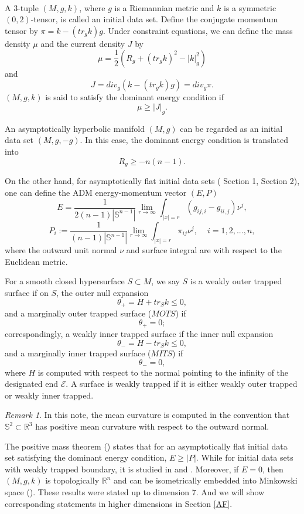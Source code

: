 \documentclass[11pt]{amsart}
\theoremstyle{remark}
\newtheorem{rem}{Remark}[section]
\numberwithin{equation}{section}
\def\R{\mathbb{R}}
\begin{document}
{{\

A 3-tuple $(M,g,k)$, where $g$ is a Riemannian metric and $k$ is a symmetric $(0,2)$-tensor, is called an initial data set. Define the conjugate momentum tensor by $\pi=k-(tr_g k)g$. Under constraint equations, we can define the mass density $\mu$ and the current density $J$ by
$$\mu=\frac{1}{2}(R_g+(tr_g k)^2-|k|_g^2)$$
and $$J=div_g(k-(tr_gk)g)=div_g\pi.$$
$(M,g,k)$ is said to satisfy the dominant energy condition if 
$$\mu\geq|J|_g.$$ 

An asymptotically hyperbolic manifold $(M,g)$ can be regarded as an initial data set $(M,g,-g)$. In this case, the dominant energy condition is translated into $$R_g\geq -n(n-1).$$ 

On the other hand, for asymptotically flat initial data sets (\cite{EHLS} Section 1, \cite{LLU21} Section 2), one can define the ADM energy-momentum vector $(E,P)$  
$$
E = \frac{1}{2(n-1)|\mathbb{S}^{n-1}|} \lim_{r \to \infty} \int_{|x| = r}  ( g_{ij,i} - g _{ii, j} ) \nu^j,
$$ 
$$P_i:=\frac{1}{(n-1)|\mathbb{S}^{n-1}|} \lim_{r \to \infty} \int_{|x| = r}  \pi_{ij} \nu^j, \,\ \,\ \,\ i=1,2,...,n,$$
where the outward unit normal $\nu$ and surface integral are with respect to the Euclidean metric. 

For a smooth closed hypersurface $S\subset M$, we say $S$ is a weakly outer trapped surface if on $S$, the outer null expansion 
$$\theta_+=H+tr_S k \leq 0,$$
and a marginally outer trapped surface ($MOTS$) if 
$$\theta_+=0;$$
correspondingly, 
a weakly inner trapped surface if the inner null expansion 
$$\theta_-=H-tr_S k \leq 0,$$
and a marginally inner trapped surface ($MITS$) if 
$$\theta_-=0,$$ 
where $H$ is computed with respect to the normal pointing to the infinity of the designated end $\mathcal{E}$. A surface is weakly trapped if it is either weakly outer trapped or weakly inner trapped.  

\begin{rem} In this note, the mean curvature is computed in the convention that $\mathbb{S}^2\subset \R^3$ has positive mean curvature with respect to the outward normal.  
\end{rem}

The positive mass theorem (\cite{EHLS}) states that for an asymptotically flat initial data set satisfying the dominant energy condition, $E\geq |P|$. While for initial data sets with weakly trapped boundary, it is studied in \cite{GL} and \cite{LLU21}. Moreover, if $E=0$, then $(M,g,k)$ is topologically $\R^n$ and can be isometrically embedded into Minkowski space (\cite{SY2, E3, LLU21}).  These results were stated up to dimension 7. And we will show corresponding statements in higher dimensions in Section \ref{AF}.  

}}
\end{document}
